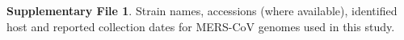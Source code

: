 \documentclass[9pt,lineno]{elife}
\begin{document}



\textbf{Supplementary File 1}. Strain names, accessions (where available), identified host and reported collection dates for MERS-CoV genomes used in this study.
\end{document}
